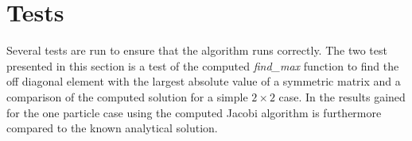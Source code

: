 \section{Tests}
\label{sec:tests}
Several tests are run to ensure that the algorithm runs correctly. 
The two test presented in this section is a test of the computed \textit{find\_max} function to find the off diagonal element with the largest absolute value of a symmetric matrix and a comparison of the computed solution for a simple $2\times 2$ case.
In  the results gained for the one particle case using the computed Jacobi algorithm is furthermore compared to the known analytical solution.